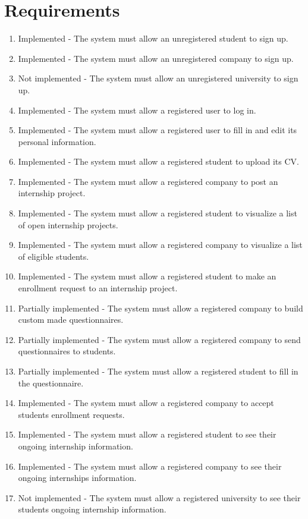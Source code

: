 \section{Requirements}

\begin{enumerate}[label=\textbf{R\arabic* -}]
    \item Implemented - The system must allow an unregistered student to sign up.
    \item Implemented - The system must allow an unregistered company to sign up.
    \item Not implemented - The system must allow an unregistered university to sign up.
    \item Implemented - The system must allow a registered user to log in.
    \item Implemented - The system must allow a registered user to fill in and edit its personal information.
    \item Implemented - The system must allow a registered student to upload its CV.
    \item Implemented - The system must allow a registered company to post an internship project.
    \item Implemented - The system must allow a registered student to visualize a list of open internship projects.
    \item Implemented - The system must allow a registered company to visualize a list of eligible students.
    \item Implemented - The system must allow a registered student to make an enrollment request to an internship project.
    \item Partially implemented - The system must allow a registered company to build custom made questionnaires.
    \item Partially implemented - The system must allow a registered company to send questionnaires to students.
    \item Partially implemented - The system must allow a registered student to fill in the questionnaire.
    \item Implemented - The system must allow a registered company to accept students enrollment requests.
    \item Implemented - The system must allow a registered student to see their ongoing internship information.
    \item Implemented - The system must allow a registered company to see their ongoing internships information.
    \item Not implemented - The system must allow a registered university to see their students ongoing internship information.

\end{enumerate}
